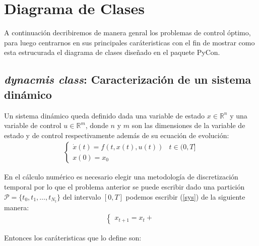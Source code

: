 \documentclass[]{article}
\begin{document}
\section{Diagrama de Clases}

A continuación decribiremos de manera genral los problemas de control óptimo, para luego centrarnos en sus principales caráteristicas con el fin de mostrar como esta estrucurada el diagrama de clases diseñado en el paquete PyCon. 

\subsection{\emph{dynacmis class}: Caracterización de un sistema dinámico}


Un sistema dinámico queda definido dada una variable de estado $x \in \mathbb{R}^n$  y una variable de control $u \in \mathbb{R}^m$, donde $n$ y $m$ son las dimensiones de la variable de estado y de control respectivamente además de su ecuación de evolución:
\begin{gather}\label{sys}
    \begin{cases}
        \dot{x}(t) = f(t,x(t),u(t)) & t \in (0,T]\\
        x(0) = x_0
    \end{cases}  
\end{gather}

En el cálculo numérico es necesario elegir una metodología de discretización temporal por lo que el problema anterior se puede escribir dado una partición $\mathcal{P}=\{t_0,t_1,\dots,t_{N_t}\}$ del intervalo $[0,T]$ podemos escribir (\ref{sys}) de la siguiente manera:
\begin{gather}
    \begin{cases}
        x_{t+1} = x_{t} + 
    \end{cases}
\end{gather}

Entonces los caráteristicas que lo define son: 
\end{document}
